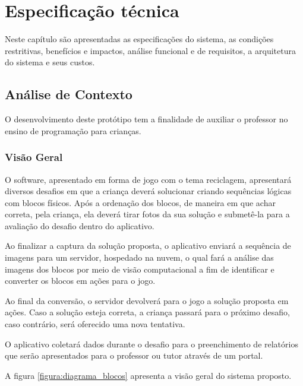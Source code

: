\chapter{Especificação técnica} \label{cap:especificacao_tecnica}
Neste capítulo são apresentadas as especificações do sistema, as condições restritivas, benefícios e impactos, análise funcional e de requisitos, a arquitetura do sistema e seus custos.

\section{Análise de Contexto}

    O desenvolvimento deste protótipo tem a finalidade de auxiliar o professor no ensino de programação para crianças.
    
    \subsection{Visão Geral}
    
    O software, apresentado em forma de jogo com o tema reciclagem, apresentará diversos desafios em que a criança deverá solucionar criando sequências lógicas com blocos físicos. Após a ordenação dos blocos, de maneira em que achar correta, pela criança, ela deverá tirar fotos da sua solução e submetê-la para a avaliação do desafio dentro do aplicativo.
    
    Ao finalizar a captura da solução proposta, o aplicativo enviará a sequência de imagens para um servidor, hospedado na nuvem, o qual fará a análise das imagens dos blocos
    por meio de visão computacional a fim de identificar e converter os blocos em ações para o jogo.
    
    Ao final da conversão, o servidor devolverá para o jogo a solução proposta em ações.
    Caso a solução esteja correta, a criança passará para o próximo desafio, caso contrário, será oferecido uma nova tentativa.
    
    O aplicativo coletará dados durante o desafio para o preenchimento de relatórios que serão apresentados para o professor ou tutor através de um portal.
    
    A figura \ref{figura:diagrama_blocos} apresenta a visão geral do sistema proposto.
    
